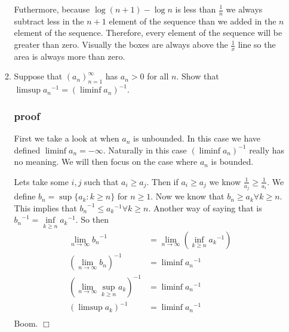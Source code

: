 \documentclass[letterpaper]{article}
\begin{document}
\begin{enumerate}
\begin{enumerate}
  Futhermore, because $\log(n+1)-\log n$ is less than $\frac{1}{n}$ we always subtract less in the $n+1$ element of the sequence than we added in the $n$ element of the sequence.
  Therefore, every element of the sequence will be greater than zero.
  Visually the boxes are always above the $\frac{1}{x}$ line so the area is always more than zero.
  \setcounter{enumii}{12}
  \item
  Suppose that $(a_n)_{n=1}^\infty$ has $a_n>0$ for all $n$. Show that $\limsup {a_n}^{-1}=(\liminf a_n)^{-1}$.
  \subsubsection*{proof}
  First we take a look at when $a_n$ is unbounded.
  In this case we have defined $\liminf a_n=-\infty$.
  Naturally in this case $(\liminf a_n)^{-1}$ really has no meaning.
  We will then focus on the case where $a_n$ is bounded.
  
  Lets take some $i,j$ such that $a_i\ge a_j$.
  Then if $a_i\ge a_j$ we know $\frac{1}{a_j}\ge \frac{1}{a_i}$.
  We define $b_n=\sup\{a_k:k\ge n\}$ for $n\ge 1$.
  Now we know that $b_n\ge a_k\forall k\ge n$.
  This implies that ${b_n}^{-1}\le {a_k}^{-1}\forall k\ge n$.
  Another way of saying that is $\displaystyle{b_n}^{-1}=\inf\limits_{k\ge n}{{a_k}^{-1}}$.
  So then
  \begin{align*}
    \lim\limits_{n\to\infty}{b_n}^{-1}&=\lim_{n\to\infty}\left(\inf_{k\ge n}{a_k}^{-1}\right)\\
    \left(\lim\limits_{n\to\infty}{b_n}\right)^{-1}&=\liminf{a_n}^{-1}\\
    \left(\lim\limits_{n\to\infty}{\sup_{k\ge n}a_k}\right)^{-1}&=\liminf{a_n}^{-1}\\
    \left(\limsup a_k\right)^{-1}&=\liminf{a_n}^{-1}\\
  \end{align*}
  Boom. $\Box$
  \end{enumerate}
\end{enumerate}
\end{document}
